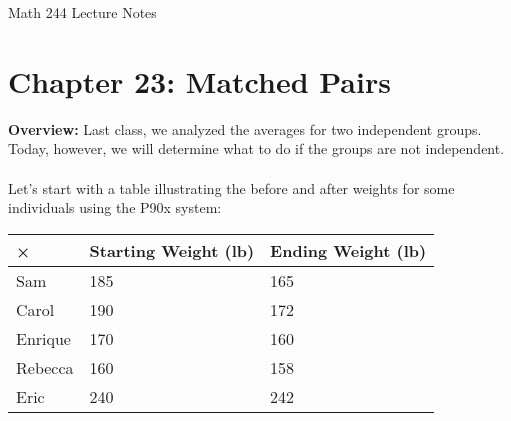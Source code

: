 \documentclass[12pt]{amsart}
\date{}
\theoremstyle{definition}
\begin{document}
\newcommand{\ph}{\phantom}
\newcommand{\ds}{\displaystyle}

\renewcommand{\emph}{\textbf}
\onehalfspace


\fancyhf{}   %
\renewcommand{\headrulewidth}{0.4pt} %
\fancyfootoffset[LE,LO]{0in}        %
\renewcommand{\footrulewidth}{0.4pt} %




\begin{center}

	\larger[3]	Math 244 Lecture Notes \smaller[3]		\\[22pt]

\end{center}

\section*{Chapter 23: Matched Pairs}




 \textbf{Overview:} Last class, we analyzed the averages for two independent groups. Today, however, we will determine what to do if the groups are not independent.\\
 ~\\
 \noindent Let's start with a table illustrating the before and after weights for some individuals using the P90x system:
 
 \begin{center}
\begin{tabular}{l|l|l|}
× & Starting Weight (lb) & Ending Weight (lb)\\\hline
Sam & 185 & 165\\\hline
Carol & 190 & 172\\\hline
Enrique & 170 & 160\\\hline
Rebecca & 160 & 158\\\hline
Eric & 240 & 242\\\hline
 \end{tabular}
 \end{center}
\end{document}
